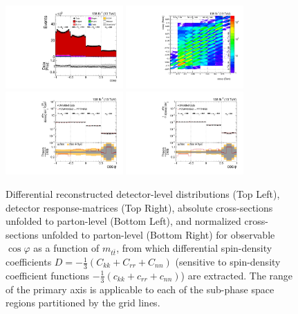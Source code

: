 \clearpage
\begin{figure}[htb]
\begin{center}
 \includegraphics[width=0.40\textwidth]{fig_fullRun2UL/controlplots/combined/Hyp_LLBarcHel_vs_TTBarMass.pdf}
 \includegraphics[width=0.40\textwidth]{fig_fullRun2UL/unfolding/combined/ResponseMatrix_ll_cHel_mttbar.pdf} \\
 \includegraphics[width=0.40\textwidth]{fig_fullRun2UL/unfolding/combined/UnfoldedResults_ll_cHel_mttbar.pdf}
 \includegraphics[width=0.40\textwidth]{fig_fullRun2UL/unfolding/combined/UnfoldedResultsNorm_ll_cHel_mttbar.pdf} \\
\label{fig:ll_cHel_mttbar}
\caption{Differential reconstructed detector-level distributions (Top Left), detector response-matrices (Top Right), absolute cross-sections unfolded to parton-level (Bottom Left), and normalized cross-sections unfolded to parton-level (Bottom Right) for  observable $\cos\varphi$ as a function of $m_{t\bar{t}}$, from which differential spin-density coefficients $D = -\frac{1}{3}(C_{kk} + C_{rr} + C_{nn})$ (sensitive to spin-density coefficient functions $-\frac{1}{3}(c_{kk} + c_{rr} + c_{nn})$) are extracted.  The range of the primary axis is applicable to each of the sub-phase space regions partitioned by the grid lines.}
\end{center}
\end{figure}
\clearpage


